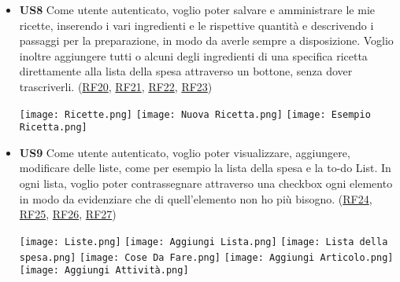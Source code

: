 \documentclass[a4paper,12pt]{article}
\begin{document}
\begin{itemize}
\item \textbf {US8}  Come utente autenticato, voglio poter salvare e amministrare le mie ricette, inserendo i vari ingredienti e le rispettive quantità e descrivendo i passaggi per la preparazione, in modo da averle sempre a disposizione. Voglio inoltre aggiungere tutti o alcuni degli ingredienti di una specifica ricetta direttamente alla lista della spesa attraverso un bottone, senza dover trascriverli. (\hyperlink{RF20}{RF20}, \hyperlink{RF21}{RF21}, \hyperlink{RF22}{RF22}, \hyperlink{RF23}{RF23})

\begin{center}
  \texttt{[image: Ricette.png]}
  \texttt{[image: Nuova Ricetta.png]}
  \texttt{[image: Esempio Ricetta.png]}
\end{center}

\item \textbf {US9}  Come utente autenticato, voglio poter visualizzare, aggiungere, modificare delle liste, come per esempio la lista della spesa e la to-do List. In ogni lista, voglio poter contrassegnare attraverso una checkbox ogni elemento in modo da evidenziare che di quell'elemento non ho più bisogno. (\hyperlink{RF24}{RF24}, \hyperlink{RF25}{RF25}, \hyperlink{RF26}{RF26}, \hyperlink{RF27}{RF27})

\begin{center}
  \texttt{[image: Liste.png]}
  \texttt{[image: Aggiungi Lista.png]}
  \texttt{[image: Lista della spesa.png]}
  \texttt{[image: Cose Da Fare.png]}
  \texttt{[image: Aggiungi Articolo.png]}
  \texttt{[image: Aggiungi Attività.png]}
\end{center}

\end{itemize}
\end{document}
